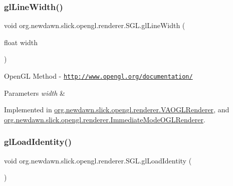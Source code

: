 \mbox{\label{interfaceorg_1_1newdawn_1_1slick_1_1opengl_1_1renderer_1_1_s_g_l_a6c064bfcda5e00a6b94f15f0c3b448f4}} 
\subsubsection{\texorpdfstring{gl\+Line\+Width()}{glLineWidth()}}
{\footnotesize\ttfamily void org.\+newdawn.\+slick.\+opengl.\+renderer.\+S\+G\+L.\+gl\+Line\+Width (\begin{DoxyParamCaption}\item[{float}]{width }\end{DoxyParamCaption})}

Open\+GL Method -\/  \href{http://www.opengl.org/documentation/}{\tt http\+://www.\+opengl.\+org/documentation/}


\begin{DoxyParams}{Parameters}
{\em width} & \\
\hline
\end{DoxyParams}


Implemented in \mbox{\hyperlink{classorg_1_1newdawn_1_1slick_1_1opengl_1_1renderer_1_1_v_a_o_g_l_renderer_a2dec01f79be6ca9a13fb785cb03dcdbc}{org.\+newdawn.\+slick.\+opengl.\+renderer.\+V\+A\+O\+G\+L\+Renderer}}, and \mbox{\hyperlink{classorg_1_1newdawn_1_1slick_1_1opengl_1_1renderer_1_1_immediate_mode_o_g_l_renderer_a31bc611222a137427b8795f830af7eb7}{org.\+newdawn.\+slick.\+opengl.\+renderer.\+Immediate\+Mode\+O\+G\+L\+Renderer}}.

\mbox{\label{interfaceorg_1_1newdawn_1_1slick_1_1opengl_1_1renderer_1_1_s_g_l_a55d2290e0e4840f3aff84bf698d0ea60}} 
\subsubsection{\texorpdfstring{gl\+Load\+Identity()}{glLoadIdentity()}}
{\footnotesize\ttfamily void org.\+newdawn.\+slick.\+opengl.\+renderer.\+S\+G\+L.\+gl\+Load\+Identity (\begin{DoxyParamCaption}{ }\end{DoxyParamCaption})}

